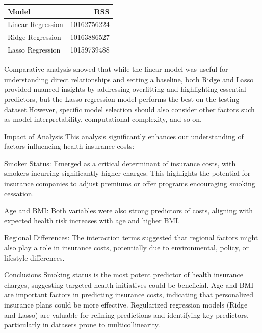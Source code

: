\documentclass[
  12pt,
]{article}
\begin{document}
\begin{longtable}[]{@{}lr@{}}
\toprule\noalign{}
Model & RSS \\
\midrule\noalign{}
\endhead
\bottomrule\noalign{}
\endlastfoot
Linear Regression & 10162756224 \\
Ridge Regression & 10163886527 \\
Lasso Regression & 10159739488 \\
\end{longtable}

Comparative analysis showed that while the linear model was useful for
understanding direct relationships and setting a baseline, both Ridge
and Lasso provided nuanced insights by addressing overfitting and
highlighting essential predictors, but the Lasso regression model
performs the best on the testing dataset.However, specific model
selection should also consider other factors such as model
interpretability, computational complexity, and so on.

Impact of Analysis This analysis significantly enhances our
understanding of factors influencing health insurance costs:

Smoker Status: Emerged as a critical determinant of insurance costs,
with smokers incurring significantly higher charges. This highlights the
potential for insurance companies to adjust premiums or offer programs
encouraging smoking cessation.

Age and BMI: Both variables were also strong predictors of costs,
aligning with expected health risk increases with age and higher BMI.

Regional Differences: The interaction terms suggested that regional
factors might also play a role in insurance costs, potentially due to
environmental, policy, or lifestyle differences.

Conclusions Smoking status is the most potent predictor of health
insurance charges, suggesting targeted health initiatives could be
beneficial. Age and BMI are important factors in predicting insurance
costs, indicating that personalized insurance plans could be more
effective. Regularized regression models (Ridge and Lasso) are valuable
for refining predictions and identifying key predictors, particularly in
datasets prone to multicollinearity.
\end{document}
